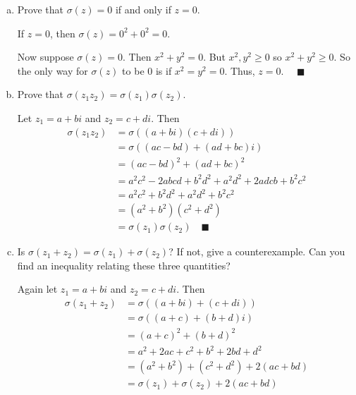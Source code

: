 \documentclass[12pt]{article}
\newcommand{\qed}{\quad \blacksquare}
\begin{document}
\begin{enumerate}[(a)]
    \item Prove that $\sigma(z) = 0$ if and only if $z = 0$.

        \color{blue}
            If $z = 0$, then $\sigma(z) = 0^2 + 0^2 = 0$. 
            
            Now suppose $\sigma(z) = 0$. Then $x^2 + y^2 = 0$. But $x^2, y^2 \geq 0$ so $x^2 + y^2 \geq 0$. So the only way for $\sigma(z)$ to be $0$ is if $x^2 = y^2 = 0$. Thus,  $z = 0$. $\qed$
        \color{black}

    \item Prove that $\sigma(z_1z_2) = \sigma(z_1)\sigma(z_2)$.
    
        \color{blue}
            Let $z_1 = a + bi$ and $z_2 = c + di$. Then 
            \begin{align*}
                \sigma(z_1z_2) &= \sigma((a + bi)(c + di))\\ 
                    &= \sigma((ac - bd) + (ad + bc)i)\\
                    &= (ac - bd)^2 + (ad + bc)^2\\
                    &= a^2c^2 - 2abcd + b^2d^2 + a^2d^2 + 2adcb + b^2c^2\\
                    &= a^2c^2 + b^2d^2 + a^2d^2 + b^2c^2\\
                    &= (a^2 + b^2)(c^2 + d^2)\\
                    &= \sigma(z_1)\sigma(z_2) \qed
            \end{align*}
        \color{black}
    
    \item Is $\sigma(z_1 + z_2) = \sigma(z_1) + \sigma(z_2)$? If not, give a counterexample. Can you find an inequality relating these three quantities? 
    
        \color{blue}
            Again let $z_1 = a + bi$ and $z_2 = c + di$. Then
            \begin{align*}
                \sigma(z_1 + z_2) &= \sigma((a + bi) + (c + di))\\
                    &= \sigma((a + c) + (b + d)i)\\
                    &= (a + c)^2 + (b + d)^2\\
                    &= a^2 + 2ac + c^2 + b^2 + 2bd + d^2\\
                    &= (a^2 + b^2) + (c^2 + d^2) + 2(ac + bd)\\
                    &= \sigma(z_1) + \sigma(z_2) + 2(ac + bd)
            \end{align*}
            

\end{enumerate}
\end{document}
